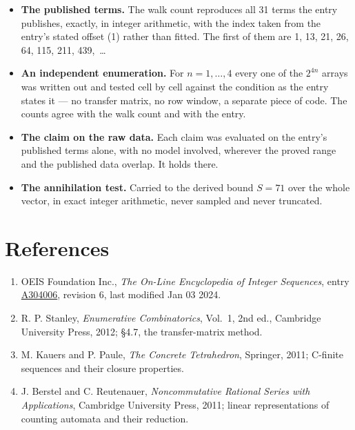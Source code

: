 \documentclass[11pt]{article}
\theoremstyle{definition}
\begin{document}
\begin{itemize}

\item {\bfseries The published terms.} The walk count reproduces all 31 terms the entry publishes, exactly, in integer arithmetic, with the index taken from the entry's stated offset (1) rather than fitted. The first of them are 1, 13, 21, 26, 64, 115, 211, 439,~\dots

\item {\bfseries An independent enumeration.} For $n = 1,\dots,4$ every one of the $2^{4n}$ arrays was written out and tested cell by cell against the condition as the entry states it --- no transfer matrix, no row window, a separate piece of code. The counts agree with the walk count and with the entry.

\item {\bfseries The claim on the raw data.} Each claim was evaluated on the entry's published terms alone, with no model involved, wherever the proved range and the published data overlap. It holds there.

\item {\bfseries The annihilation test.} Carried to the derived bound $S = 71$ over the whole vector, in exact integer arithmetic, never sampled and never truncated.

\end{itemize}

\section{References}

\begin{enumerate}

\item OEIS Foundation Inc., \emph{The On-Line Encyclopedia of Integer Sequences}, entry \href{https://oeis.org/A304006}{A304006}, revision 6, last modified Jan 03 2024.

\item R. P. Stanley, \emph{Enumerative Combinatorics}, Vol.~1, 2nd ed., Cambridge University Press, 2012; \S4.7, the transfer-matrix method.

\item M. Kauers and P. Paule, \emph{The Concrete Tetrahedron}, Springer, 2011; C-finite sequences and their closure properties.

\item J. Berstel and C. Reutenauer, \emph{Noncommutative Rational Series with Applications}, Cambridge University Press, 2011; linear representations of counting automata and their reduction.

\end{enumerate}
\end{document}
